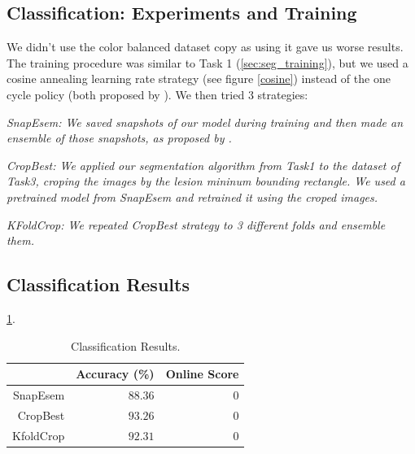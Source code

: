 \documentclass[conference]{IEEEtran}
\begin{document}
\subsection{Classification: Experiments and Training}



We didn't use the color balanced dataset copy as using it gave us worse results. The training procedure was similar to Task 1 (\ref{sec:seg_training}), but we used a cosine annealing learning rate strategy (see figure \ref{cosine}) instead of the one cycle policy (both proposed by \cite{leslie}). We then tried 3 strategies:

\em{SnapEsem}: We saved snapshots of our model during training and then made an ensemble of those snapshots, as proposed by \cite{snapshots}.

\em{CropBest}: We applied our segmentation algorithm from Task1 to the dataset of Task3, croping the images by the lesion mininum bounding rectangle. We used a pretrained model from SnapEsem and retrained it using the croped images.

\em{KFoldCrop}: We repeated CropBest strategy to 3 different folds and ensemble them. 

\subsection{Classification Results}

\ref{tabela}.
\begin{table}[]
\centering
\caption{Classification Results.}
\label{tabela}
\begin{tabular}{@{}rrr@{}}
\toprule
            & \multicolumn{1}{c}{Accuracy (\%)} & \multicolumn{1}{c}{Online Score} \\ \midrule
SnapEsem & \(88.36\)& \(0\)                                  \\ \midrule
CropBest   & \(93.26\)&  \(0\)                                \\ \midrule
KfoldCrop    & \(92.31\)  & \(0\)                              \\ \bottomrule
\end{tabular}
\end{table}
\end{document}
